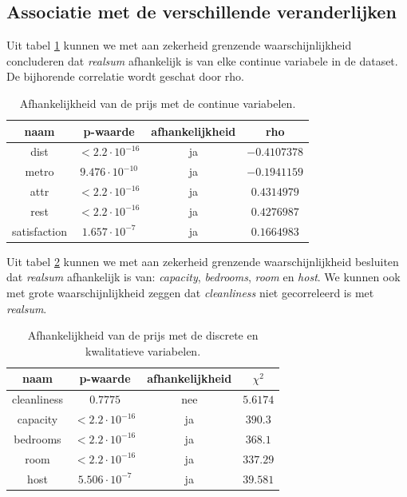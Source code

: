 \documentclass[a4paper]{kulakarticle}
\begin{document}
	\subsection{Associatie met de verschillende veranderlijken}
	
	Uit tabel \ref{continue variabelen afhankelijkheid} kunnen we met aan zekerheid grenzende waarschijnlijkheid concluderen dat \textit{realsum} afhankelijk is van elke continue variabele in de dataset. De bijhorende correlatie wordt geschat door rho.
	\begin{table}[h]
		\begin{tabular}{c|c|c|c }
			naam & p-waarde & afhankelijkheid & rho\\
			\hline
			\hline
			dist & $< 2.2 \cdot 10^{-16} $&ja& $-0.4107378$ \\
			metro &$ 9.476\cdot 10^{-10}$& ja& $-0.1941159$ \\ 
			attr &$ < 2.2\cdot 10^{-16}$& ja&$0.4314979 $ \\
			rest &$ < 2.2\cdot 10^{-16}$& ja&$0.4276987 $ \\
			satisfaction &$ 1.657\cdot 10^{-7}$& ja&$0.1664983 $ \\
		\end{tabular}
		\caption{Afhankelijkheid van de prijs met de continue variabelen.}
		\label{continue variabelen afhankelijkheid}
	\end{table}
	Uit tabel \ref{discrete variabelen afhankelijkheid} kunnen we met aan zekerheid grenzende waarschijnlijkheid besluiten dat \textit{realsum} afhankelijk is van: \textit{capacity}, \textit{bedrooms}, \textit{room} en \textit{host}. We kunnen ook met grote waarschijnlijkheid zeggen dat \textit{cleanliness} niet gecorreleerd is met \textit{realsum}. 
	
	\begin{table}[h]
		\begin{tabular}{c|c|c|c }
			naam & p-waarde & afhankelijkheid & $\chi ^2$\\
			\hline
			\hline
			cleanliness & $0.7775$&nee& $5.6174$ \\
			capacity &$ < 2.2\cdot 10^{-16}$& ja& $390.3$ \\ 
			bedrooms &$ < 2.2\cdot 10^{-16}$& ja&$368.1 $ \\
			room &$ < 2.2\cdot 10^{-16}$& ja&$ 337.29$ \\
			host &$ 5.506\cdot 10^{-7}$& ja&$39.581 $ \\
		\end{tabular}
		\caption{Afhankelijkheid van de prijs met de discrete en kwalitatieve variabelen.}
		\label{discrete variabelen afhankelijkheid}
	\end{table}
	
\end{document}

